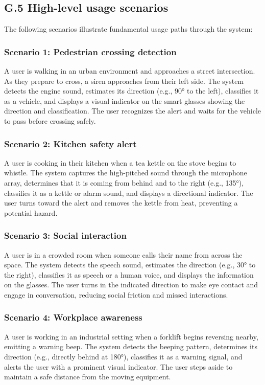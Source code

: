 \documentclass[12pt]{article}
\theoremstyle{definition}
\begin{document}
\subsection{G.5 High-level usage scenarios} \label{item: G.5}

The following scenarios illustrate fundamental usage paths through the system:

\subsubsection{Scenario 1: Pedestrian crossing detection}
A user is walking in an urban environment and approaches a street intersection.
As they prepare to cross, a siren approaches from their left side. The system
detects the engine sound, estimates its direction (e.g., 90° to the left),
classifies it as a vehicle, and displays a visual indicator on the smart glasses
showing the direction and classification. The user recognizes the alert and
waits for the vehicle to pass before crossing safely.

\subsubsection{Scenario 2: Kitchen safety alert}
A user is cooking in their kitchen when a tea kettle on the stove begins to
whistle. The system captures the high-pitched sound through the microphone
array, determines that it is coming from behind and to the right (e.g., 135°),
classifies it as a kettle or alarm sound, and displays a directional indicator.
The user turns toward the alert and removes the kettle from heat, preventing a
potential hazard.

\subsubsection{Scenario 3: Social interaction}
A user is in a crowded room when someone calls their name from across the space.
The system detects the speech sound, estimates the direction (e.g., 30° to the
right), classifies it as speech or a human voice, and displays the information
on the glasses. The user turns in the indicated direction to make eye contact
and engage in conversation, reducing social friction and missed interactions.

\subsubsection{Scenario 4: Workplace awareness}
A user is working in an industrial setting when a forklift begins reversing
nearby, emitting a warning beep. The system detects the beeping pattern,
determines its direction (e.g., directly behind at 180°), classifies it as a
warning signal, and alerts the user with a prominent visual indicator. The user
steps aside to maintain a safe distance from the moving equipment.
\end{document}
